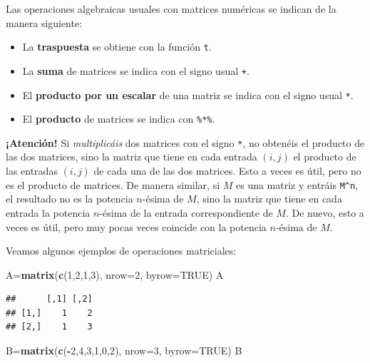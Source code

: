 \documentclass[]{book}
\newenvironment{Shaded}{\begin{snugshade}}{\end{snugshade}}
\newcommand{\DataTypeTok}[1]{\textcolor[rgb]{0.13,0.29,0.53}{#1}}
\newcommand{\DecValTok}[1]{\textcolor[rgb]{0.00,0.00,0.81}{#1}}
\newcommand{\KeywordTok}[1]{\textcolor[rgb]{0.13,0.29,0.53}{\textbf{#1}}}
\newcommand{\NormalTok}[1]{#1}
\newcommand{\OperatorTok}[1]{\textcolor[rgb]{0.81,0.36,0.00}{\textbf{#1}}}
\newcommand{\OtherTok}[1]{\textcolor[rgb]{0.56,0.35,0.01}{#1}}
\theoremstyle{definition}
\theoremstyle{definition}
\theoremstyle{definition}
\theoremstyle{remark}
\begin{document}
Las operaciones algebraicas usuales con matrices numéricas se indican de la manera siguiente:

\begin{itemize}
\item
  La \textbf{traspuesta} se obtiene con la función \texttt{t}.
\item
  La \textbf{suma} de matrices se indica con el signo usual \texttt{+}.
\item
  El \textbf{producto por un escalar} de una matriz se indica con el signo usual \texttt{*}.
\item
  El \textbf{producto} de matrices se indica con \texttt{\%*\%}.
\end{itemize}

\textbf{¡Atención!} Si \emph{multiplicáis} dos matrices con el signo \texttt{*}, no obtenéis el producto de las dos matrices, sino la matriz que tiene en cada entrada \((i, j)\) el producto de las entradas \((i, j)\) de cada una de las dos matrices. Esto a veces es útil, pero no es el producto de matrices. De manera similar, si \(M\) es una matriz y entráis \texttt{M\^{}n}, el resultado no es la potencia \(n\)-ésima de \(M\), sino la matriz que tiene en cada entrada la potencia \(n\)-ésima de la entrada correspondiente de \(M\). De nuevo, esto a veces es útil, pero muy pocas veces coincide con la potencia \(n\)-ésima de \(M\).

Veamos algunos ejemplos de operaciones matriciales:

\begin{Shaded}
\begin{Highlighting}[]
\NormalTok{A=}\KeywordTok{matrix}\NormalTok{(}\KeywordTok{c}\NormalTok{(}\DecValTok{1}\NormalTok{,}\DecValTok{2}\NormalTok{,}\DecValTok{1}\NormalTok{,}\DecValTok{3}\NormalTok{), }\DataTypeTok{nrow=}\DecValTok{2}\NormalTok{, }\DataTypeTok{byrow=}\OtherTok{TRUE}\NormalTok{)}
\NormalTok{A}
\end{Highlighting}
\end{Shaded}

\begin{verbatim}
##      [,1] [,2]
## [1,]    1    2
## [2,]    1    3
\end{verbatim}

\begin{Shaded}
\begin{Highlighting}[]
\NormalTok{B=}\KeywordTok{matrix}\NormalTok{(}\KeywordTok{c}\NormalTok{(}\OperatorTok{-}\DecValTok{2}\NormalTok{,}\DecValTok{4}\NormalTok{,}\DecValTok{3}\NormalTok{,}\DecValTok{1}\NormalTok{,}\DecValTok{0}\NormalTok{,}\DecValTok{2}\NormalTok{), }\DataTypeTok{nrow=}\DecValTok{3}\NormalTok{, }\DataTypeTok{byrow=}\OtherTok{TRUE}\NormalTok{)}
\NormalTok{B}
\end{Highlighting}
\end{Shaded}
\end{document}
